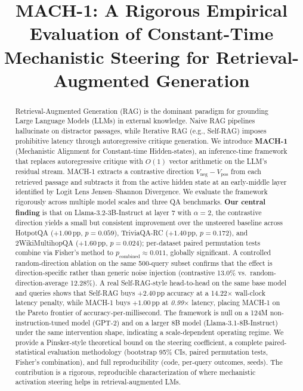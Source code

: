 \documentclass[conference]{IEEEtran}
\begin{document}
\title{MACH-1: A Rigorous Empirical Evaluation of Constant-Time Mechanistic Steering for Retrieval-Augmented Generation}

\author{
}

\maketitle

\begin{abstract}
Retrieval-Augmented Generation (RAG) is the dominant paradigm for grounding Large Language Models (LLMs) in external knowledge. Naive RAG pipelines hallucinate on distractor passages, while Iterative RAG (e.g., Self-RAG) imposes prohibitive latency through autoregressive critique generation. We introduce \textbf{MACH-1} (Mechanistic Alignment for Constant-time Hidden-states), an inference-time framework that replaces autoregressive critique with $O(1)$ vector arithmetic on the LLM's residual stream. MACH-1 extracts a contrastive direction $V_{\text{neg}}-V_{\text{pos}}$ from each retrieved passage and subtracts it from the active hidden state at an early-middle layer identified by Logit Lens Jensen--Shannon Divergence. We evaluate the framework rigorously across multiple model scales and three QA benchmarks. \textbf{Our central finding} is that on Llama-3.2-3B-Instruct at layer 7 with $\alpha\!=\!2$, the contrastive direction yields a small but consistent improvement over the unsteered baseline across HotpotQA ($+1.00$\,pp, $p\!=\!0.059$), TriviaQA-RC ($+1.40$\,pp, $p\!=\!0.172$), and 2WikiMultihopQA ($+1.60$\,pp, $p\!=\!0.024$); per-dataset paired permutation tests combine via Fisher's method to $p_{\text{combined}}\!\approx\!0.011$, globally significant. A controlled random-direction ablation on the same 500-query subset confirms that the effect is direction-specific rather than generic noise injection (contrastive 13.0\% vs.\ random-direction-average 12.28\%). A real Self-RAG-style head-to-head on the same base model and queries shows that Self-RAG buys $+2.40$\,pp accuracy at a 14.22$\times$ wall-clock latency penalty, while MACH-1 buys $+1.00$\,pp at \emph{0.99$\times$} latency, placing MACH-1 on the Pareto frontier of accuracy-per-millisecond. The framework is null on a 124M non-instruction-tuned model (GPT-2) and on a larger 8B model (Llama-3.1-8B-Instruct) under the same intervention shape, indicating a scale-dependent operating regime. We provide a Pinsker-style theoretical bound on the steering coefficient, a complete paired-statistical evaluation methodology (bootstrap 95\% CIs, paired permutation tests, Fisher's combination), and full reproducibility (code, per-query outcomes, seeds). The contribution is a rigorous, reproducible characterization of where mechanistic activation steering helps in retrieval-augmented LMs.
\end{abstract}
\end{document}
